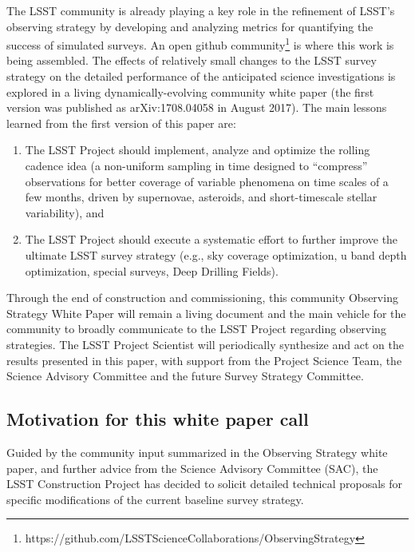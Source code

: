 \documentclass[DM,lsstdraft,toc,usenatbib]{lsstdoc}
\begin{document}
The LSST community is already playing a key role in the refinement of LSST's observing strategy 
by developing and analyzing metrics for quantifying the success of simulated surveys.
An open github community\footnote{
https://github.com/LSSTScienceCollaborations/ObservingStrategy}
is where this work is being assembled. The effects of relatively small changes to the LSST survey strategy
on the detailed performance of the anticipated science investigations 
is explored in a living dynamically-evolving community white paper (the first
version was published as arXiv:1708.04058 in August 2017). The main lessons 
learned from the first version of this paper are: 
\begin{enumerate} 
\item The LSST Project should implement, analyze and optimize the rolling cadence idea
(a non-uniform sampling in time designed to ``compress'' observations for better coverage
of variable phenomena on time scales of a few months, driven by supernovae, asteroids, and
short-timescale stellar variability), and 
\item The LSST Project should execute a systematic effort to further improve the ultimate
LSST survey strategy (e.g., sky coverage optimization, u band depth optimization, special 
surveys, Deep Drilling Fields). 
\end{enumerate} 

Through the end of construction and commissioning, this community Observing Strategy 
White Paper will remain a living document and the main vehicle for the community to broadly 
communicate to the LSST Project regarding observing strategies. The LSST Project Scientist will 
periodically synthesize and act on the results presented in this paper, with support from the 
Project Science Team, the Science Advisory Committee and the future Survey Strategy Committee.


\subsection{Motivation for this white paper call}

Guided by the community input summarized in the Observing Strategy white paper, and further 
advice from the Science Advisory Committee (SAC), the LSST Construction Project has decided to
solicit detailed technical proposals for specific modifications of the current baseline survey strategy.
\end{document}
